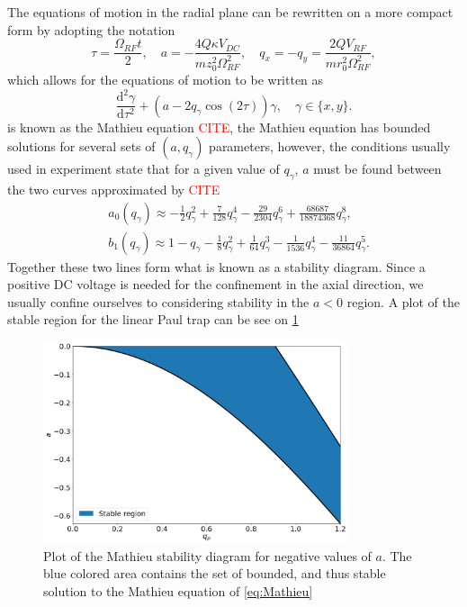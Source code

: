 The equations of motion in the radial plane can be rewritten on a more compact form by adopting the notation
\begin{equation}
    \tau = \frac{\Omega_{RF}t}{2},\quad a = -\frac{4Q\kappa V_{DC}}{mz_0^2\Omega_{RF}^2},\quad q_x = -q_y = 
    \frac{2QV_{RF}}{mr_0^2\Omega_{RF}^2},
\end{equation}
which allows for the equations of motion to be written as
\begin{equation}
    \frac{\text{d}^2\gamma}{\text{d}\tau^2} + (a-2q_\gamma\cos{(2\tau)})\gamma,\quad \gamma\in\{x,y\}
    \label{eq:Mathieu}.
\end{equation}
 is known as the Mathieu equation \textcolor{red}{CITE}, the Mathieu equation has bounded solutions for several sets of $(a,q_\gamma)$ parameters,
however, the conditions usually used in experiment state that for a given value of $q_\gamma$, $a$ must be found between the two curves approximated by \textcolor{red}{CITE}
\begin{align}
    &a_0(q_\gamma) \approx -\frac{1}{2}q_\gamma^2 +\frac{7}{128}q_\gamma^4 -\frac{29}{2304}q_\gamma^6+\frac{68687}{18874368}q_\gamma^8,\\
    &b_1(q_\gamma) \approx 1-q_\gamma-\frac{1}{8}q_\gamma^2+\frac{1}{64}q_\gamma^3-\frac{1}{1536}q_\gamma^4-\frac{11}{36864}q_\gamma^5.
\end{align}
Together these two lines form what is known as a stability diagram. Since a positive DC voltage is needed for the confinement in the axial direction, we usually confine ourselves to considering stability in the $a<0$ region. A plot of the stable region for the linear Paul trap can be see on \cref{fig:Stability1}
\begin{figure}
    \centering
    \includegraphics[width =0.8\textwidth]{main/Stability.png}
    \caption{Plot of the Mathieu stability diagram for negative values of $a$. The blue colored area contains the set of bounded, and thus stable solution to the Mathieu equation of \cref{eq:Mathieu}}
    \label{fig:Stability1}
\end{figure}

